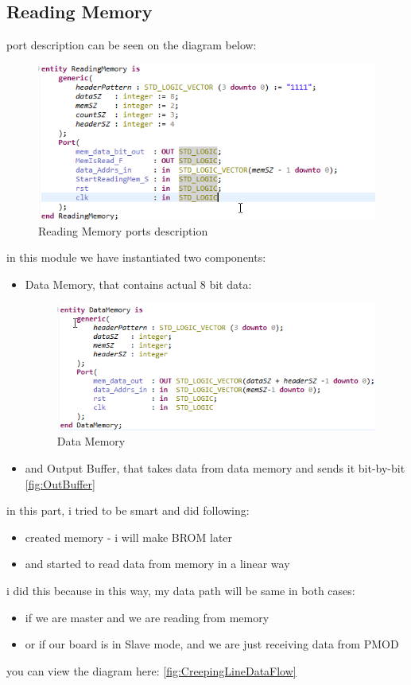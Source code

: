 \documentclass{article}
\begin{document}
\subsection{Reading Memory}
port description can be seen on the diagram below:
\begin{figure}[H]
    \centering
    \includegraphics[scale=0.7]{ReadingMemory.png}
    \caption{Reading Memory ports description}
    \label{fig:ReadingMemory}
\end{figure}
in this module we have instantiated two components:
\begin{itemize}
\item Data Memory, that contains actual 8 bit data:
\begin{figure}[H]
    \centering
    \includegraphics[scale=0.7]{DataMemory.png}
    \caption{Data Memory}
    \label{fig:DataMemory}
\end{figure}
\item and Output Buffer, that takes data from data memory and sends it bit-by-bit
\ref{fig:OutBuffer}
\end{itemize}
in this part, i tried to be smart and did following:
\begin{itemize}
\item created memory - i will make BROM later
\item and started to read data from memory in a linear way 
\end{itemize}
i did this because in this way, my data path will be same in both cases:
\begin{itemize}
\item if we are master and we are reading from memory
\item or if our board is in Slave mode, and we are just receiving data from PMOD
\end{itemize}
you can view the diagram here: \ref{fig:CreepingLineDataFlow}
\end{document}
